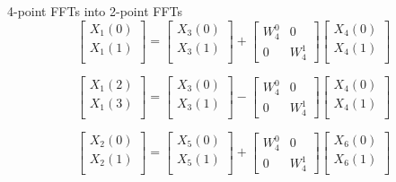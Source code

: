 \documentclass[journal,12pt,twocolumn]{IEEEtran}
\renewcommand\thesection{\arabic{section}}
\begin{document}
\begin{enumerate}[label=\arabic*.,ref=\thesection.\theenumi]
4-point FFTs into 2-point FFTs
\begin{equation}
\begin{bmatrix}
X_{1}(0) \\ 
X_{1}(1)\\ 
\end{bmatrix}
=
\begin{bmatrix}
X_{3}(0) \\ 
X_{3}(1)\\ 
\end{bmatrix}
+
\begin{bmatrix}
W^{0}_{4} & 0\\
0 & W^{1}_{4}
\end{bmatrix}
\begin{bmatrix}
X_{4}(0) \\ 
X_{4}(1) \\ 
\end{bmatrix}
\end{equation}

\begin{equation}
\begin{bmatrix}
X_{1}(2) \\ 
X_{1}(3)\\ 
\end{bmatrix}
=
\begin{bmatrix}
X_{3}(0) \\ 
X_{3}(1)\\ 
\end{bmatrix}
-
\begin{bmatrix}
W^{0}_{4} & 0\\
0 & W^{1}_{4}
\end{bmatrix}
\begin{bmatrix}
X_{4}(0) \\ 
X_{4}(1) \\ 
\end{bmatrix}
\end{equation}

\begin{equation}
\begin{bmatrix}
X_{2}(0) \\ 
X_{2}(1)\\ 
\end{bmatrix}
=
\begin{bmatrix}
X_{5}(0) \\ 
X_{5}(1)\\ 
\end{bmatrix}
+
\begin{bmatrix}
W^{0}_{4} & 0\\
0 & W^{1}_{4}
\end{bmatrix}
\begin{bmatrix}
X_{6}(0) \\ 
X_{6}(1) \\ 
\end{bmatrix}
\end{equation}


\end{enumerate}
\end{document}
